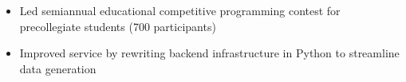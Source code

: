 {
	\begin{itemize}
		\item Led semiannual educational competitive programming contest for precollegiate students (700 participants)
		\item Improved service by rewriting backend infrastructure in Python to streamline data generation
	\end{itemize}
}
